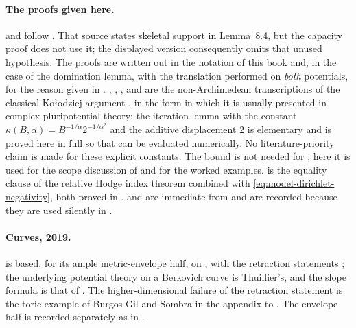 \paragraph{The proofs given here.}
 and
 follow
\cite[Lemmas~8.3--8.4]{BFJ15}.  That source states skeletal support
in Lemma~8.4, but the capacity proof does not use it; the displayed
version consequently omits that unused hypothesis.  The proofs are written out in the notation of this book and, in the case
of the domination lemma, with the translation performed on \emph{both}
potentials, for the reason given in
.  ,
, ,
 and  are the
non-Archimedean transcriptions of the classical Ko\l odziej argument
\cite{Kol98,Kol05}, in the form in which it is usually presented in complex
pluripotential theory; the iteration lemma with the constant
$\kappa(B,\alpha)=B^{-1/\alpha}2^{-1/\alpha^2}$ and the additive
displacement $2$ is elementary and is proved here in full so that
 can be evaluated numerically.
No literature-priority claim is made for these explicit constants.
The bound is not needed for ;
here it is used for the
scope discussion of  and for the worked
examples.   is the equality clause of the
relative Hodge index theorem  combined with
\eqref{eq:model-dirichlet-negativity}, both proved in
.
 and
 are immediate from
 and are recorded because they are
used silently in \cite[\S8]{BFJ15}.

\paragraph{Curves, 2019.}
 is
based, for its ample metric-envelope half, on
\cite[Theorem~1.1]{GJKM19}, with the retraction statements
\cite[Proposition~1.2 and Propositions~3.5, 3.8]{GJKM19}; the underlying
potential theory on a Berkovich curve is Thuillier's, and the slope formula
is that of .  The higher-dimensional failure of
the retraction statement is the toric example of Burgos Gil and Sombra in
the appendix to \cite{GJKM19}.  The envelope half is recorded separately as
 in .

